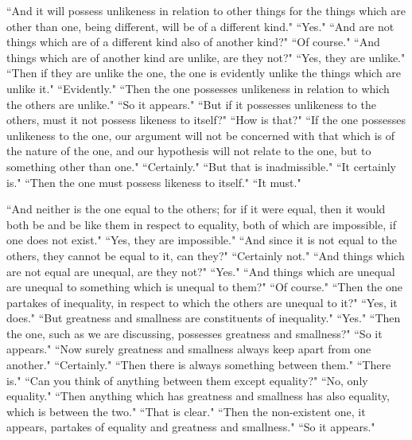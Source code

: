 \documentclass[letterpaper,12pt]{article}
\newcommand{\stephpag}[1]{\marginnote{\small\itshape\fontfamily{ppl}\selectfont #1}}
\begin{document}
``And it will possess unlikeness in relation to other things for the things which are other than one, being different, will be of a different kind." ``Yes." ``And are not things which are of a different kind also of another kind?" ``Of course." ``And things which are of another kind are unlike, are they not?" \stephpag{b} ``Yes, they are unlike." ``Then if they are unlike the one, the one is evidently unlike the things which are unlike it." ``Evidently." ``Then the one possesses unlikeness in relation to which the others are unlike." ``So it appears." ``But if it possesses unlikeness to the others, must it not possess likeness to itself?" ``How is that?" ``If the one possesses unlikeness to the one, our argument will not be concerned with that which is of the nature of the one, and our hypothesis will not relate to the one, but to something other than one." \stephpag{c} ``Certainly." ``But that is inadmissible." ``It certainly is." ``Then the one must possess likeness to itself." ``It must."

``And neither is the one equal to the others; for if it were equal, then it would both be and be like them in respect to equality, both of which are impossible, if one does not exist." ``Yes, they are impossible." ``And since it is not equal to the others, they cannot be equal to it, can they?" ``Certainly not." ``And things which are not equal are unequal, are they not?" ``Yes." ``And things which are unequal are unequal to something which is unequal to them?" ``Of course." ``Then the one partakes of inequality, in respect to which the others are unequal to it?" \stephpag{d} ``Yes, it does." ``But greatness and smallness are constituents of inequality." ``Yes." ``Then the one, such as we are discussing, possesses greatness and smallness?" ``So it appears." ``Now surely greatness and smallness always keep apart from one another." ``Certainly." ``Then there is always something between them." ``There is." ``Can you think of anything between them except equality?" ``No, only equality." ``Then anything which has greatness and smallness has also equality, which is between the two." ``That is clear." \stephpag{e} ``Then the non-existent one, it appears, partakes of equality and greatness and smallness." ``So it appears."
\end{document}
